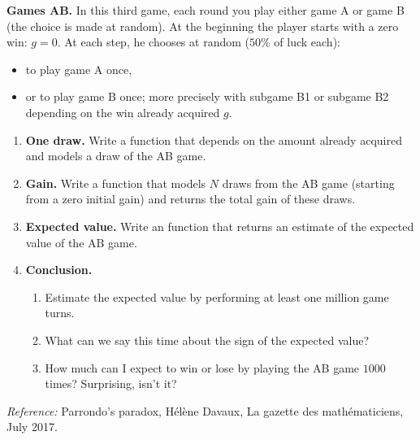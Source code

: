 \documentclass[11pt,class=report,crop=false]{standalone}
\begin{document}


\begin{activite}


\textbf{Games AB.} In this third game, each round you play either game A or game B (the choice is made at random). 
At the beginning the player starts with a zero win: $g=0$. 
At each step, he chooses at random ($50\%$ of luck each):
\begin{itemize}
  \item to play game A once,
  \item or to play game B once; more precisely with subgame B1 or subgame B2 depending on the win already acquired $g$.
\end{itemize}

\begin{enumerate}
  \item \textbf{One draw.}
  Write a  function that depends on the amount already acquired and models a draw of the AB game.
  
  \item \textbf{Gain.} Write a  function that models $N$ draws from the AB game (starting from a zero initial gain) and returns the total gain of these draws.
  
  \item \textbf{Expected value.} Write an  function that returns an estimate of the expected value of the AB game.
  
  \item \textbf{Conclusion.}
  \begin{enumerate}
    \item Estimate the expected value by performing at least one million game turns.
    \item What can we say this time about the sign of the expected value?
    \item How much can I expect to win or lose by playing the AB game $1000$ times? Surprising, isn't it?
  \end{enumerate}

\end{enumerate}
\end{activite}


\emph{Reference: } \og{}Parrondo's paradox\fg{}, Hélène Davaux, La gazette des mathématiciens, July 2017.
\end{document}
